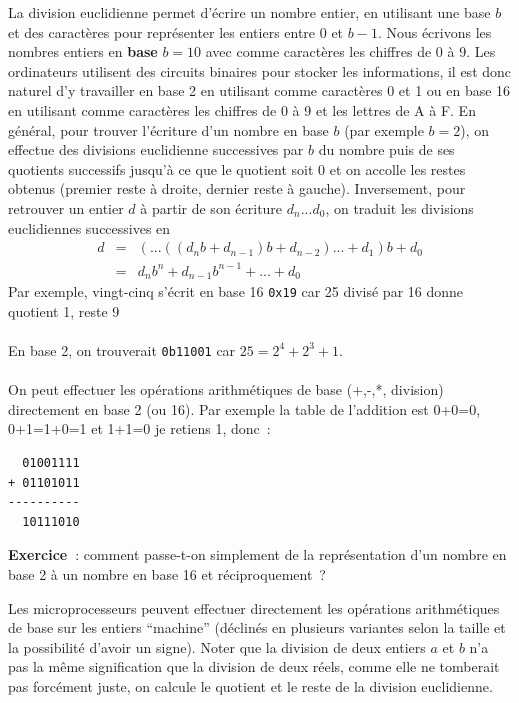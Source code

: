 \documentclass[a4paper,11pt]{book}
\begin{document}
\begin{giacjshere}
La division euclidienne permet d'écrire un nombre entier, en utilisant
une base $b$ et des caractères pour représenter les entiers
entre 0 et $b-1$. Nous \'ecrivons les nombres entiers en {\bf base} $b=10$
avec comme caractères les chiffres de 0 à 9.
Les ordinateurs utilisent des circuits binaires pour stocker
les informations, il est donc naturel d'y travailler en base 2 
en utilisant comme caractères 0 et 1 ou en base 16 en utilisant
comme caractères les chiffres de 0 à 9 et les lettres de A à F.
En g\'en\'eral, pour trouver l'\'ecriture d'un nombre en base $b$ (par
exemple $b=2$), 
on effectue des divisions euclidienne successives par $b$ du nombre puis
de ses quotients successifs jusqu'\`a ce que le quotient soit 0 et on
accolle les restes obtenus (premier reste \`a droite, dernier
reste \`a gauche).
Inversement, pour retrouver un entier $d$ \`a partir
de son \'ecriture $d_n...d_0$, on traduit les divisions euclidiennes 
successives en 
\begin{eqnarray*}
 d &=&( ... ((d_n b +d_{n-1})b + d_{n-2})...+d_1)b+d_0\\
&=& d_n b^n + d_{n-1} b^{n-1} + ... + d_0
\end{eqnarray*}
Par exemple, vingt-cinq s'\'ecrit en base 16 \verb|0x19| car 25 divis\'e
par 16 donne quotient 1, reste 9\\
\\
En base 2, on trouverait \verb|0b11001| car $25=2^4+2^3+1$.\\
\\
On peut effectuer les op\'erations arithm\'etiques de base 
(+,-,*, division) directement en base 2 (ou 16). Par exemple
la table de l'addition est 0+0=0, 0+1=1+0=1 et 1+1=0 je retiens 1,
donc~:
\begin{verbatim}
  01001111
+ 01101011
----------
  10111010
\end{verbatim}

{\bf Exercice~}: 
comment passe-t-on simplement de la représentation d'un nombre en
base 2 à un nombre en base 16 et réciproquement~?

Les microprocesseurs peuvent effectuer directement
les opérations arithmétiques de base sur les entiers ``machine''
(d\'eclin\'es en plusieurs variantes selon la taille et la
possibilit\'e d'avoir un signe). Noter que la division de deux
entiers $a$ et $b$ n'a pas la même signification que la division de deux
réels, comme elle ne tomberait pas forcément juste, 
on calcule le quotient et le reste de la division euclidienne. 


\end{giacjshere}
\end{document}
